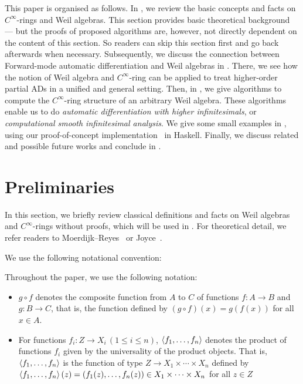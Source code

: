 This paper is organised as follows.
In , we review the basic concepts and facts on $C^\infty$-rings and Weil algebras.
This section provides basic theoretical background --- but the proofs of proposed algorithms are, however, not directly dependent on the content of this section.
So readers can skip this section first and go back afterwards when necessary.
Subsequently, we discuss the connection between Forward-mode automatic differentiation and Weil algebras in .
There, we see how the notion of Weil algebra and $C^\infty$-ring can be applied to treat higher-order partial ADs in a unified and general setting.
Then, in , we give algorithms to compute the $C^\infty$-ring structure of an arbitrary Weil algebra. These algorithms enable us to do \emph{automatic differentiation with higher infinitesimals}, or \emph{computational smooth infinitesimal analysis}.
We give some small examples in , using our proof-of-concept implementation~\cite{Ishii:2020aa} in Haskell.
Finally, we discuss related and possible future works and conclude in .

\section{Preliminaries}\label{sec:prel}
In this section, we briefly review classical definitions and facts on Weil algebras and $C^\infty$-rings without proofs, which will be used in .
For theoretical detail, we refer readers to Moerdijk--Reyes~\cite[Chapters I and II]{Moerdijk:1991aa} or Joyce~\cite{joyce2016algebraic}.

We use the following notational convention:
\begin{definition}[Notation]
  Throughout the paper, we use the following notation:
  \begin{itemize}
    \item
    $g \circ f$ denotes the composite function from $A$ to $C$ of functions $f: A \to B$ and $g: B \to C$, that is, the function defined by $(g \circ f)(x) = g(f(x))$ for all $x \in A$.
    \item For functions $f_i: Z \to X_i\,(1 \leq i \leq n)$,
    $\braket{f_1, \dots, f_n}$ denotes the product of functions $f_i$ given by the universality of the product objects.
    That is, $\braket{f_1, \dots, f_n}$ is the function of type $Z \to X_1 \times \cdots \times X_n$ defined by $\braket{f_1, \dots, f_n}(z) = (f_1(z), \dots, f_n(z)) \in X_1 \times \cdots \times X_n$ for all $z \in Z$
  \end{itemize}
\end{definition}

